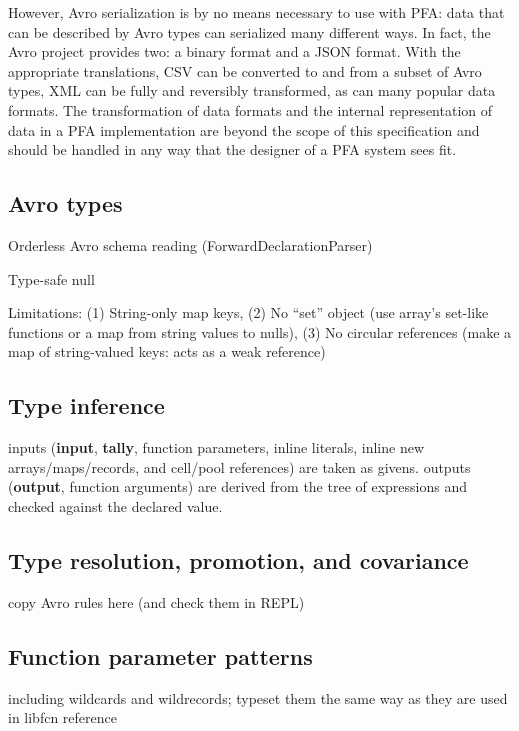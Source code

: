 \documentclass{article}
\newcommand{\PFAc}{\ttfamily\bfseries}
\theoremstyle{definition}
\begin{document}
However, Avro serialization is by no means necessary to use with PFA: data that can be described by Avro types can serialized many different ways.  In fact, the Avro project provides two: a binary format and a JSON format.  With the appropriate translations, CSV can be converted to and from a subset of Avro types, XML can be fully and reversibly transformed, as can many popular data formats.  The transformation of data formats and the internal representation of data in a PFA implementation are beyond the scope of this specification and should be handled in any way that the designer of a PFA system sees fit.

\hypertarget{hsec:avro-types}{}
\subsection{Avro types}
\label{sec:avro-types}

Orderless Avro schema reading (ForwardDeclarationParser)

Type-safe null

Limitations: (1) String-only map keys, (2) No ``set'' object (use array's set-like functions or a map from string values to nulls), (3) No circular references (make a map of string-valued keys: acts as a weak reference)

\hypertarget{hsec:type-inference}{}
\subsection{Type inference}
\label{sec:type-inference}

inputs ({\PFAc input}, {\PFAc tally}, function parameters, inline literals, inline new arrays/maps/records, and cell/pool references) are taken as givens.  outputs ({\PFAc output}, function arguments) are derived from the tree of expressions and checked against the declared value.

\subsection{Type resolution, promotion, and covariance}

copy Avro rules here (and check them in REPL)

\subsection{Function parameter patterns}

including wildcards and wildrecords; typeset them the same way as they are used in libfcn reference
\end{document}

